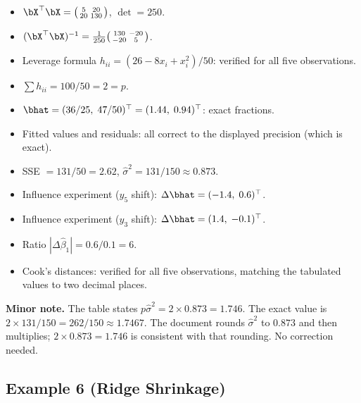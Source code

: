 \begin{itemize}[nosep]
  \item $\bX^\top\bX = \bigl(\begin{smallmatrix}5&20\\20&130\end{smallmatrix}\bigr)$, $\det = 250$. \checkmark
  \item $(\bX^\top\bX)^{-1} = \frac{1}{250}\bigl(\begin{smallmatrix}130&-20\\-20&5\end{smallmatrix}\bigr)$. \checkmark
  \item Leverage formula $h_{ii} = (26-8x_i+x_i^2)/50$: verified for all five observations. \checkmark
  \item $\sum h_{ii} = 100/50 = 2 = p$. \checkmark
  \item $\bhat = (36/25,\;47/50)^\top = (1.44,\;0.94)^\top$: exact fractions. \checkmark
  \item Fitted values and residuals: all correct to the displayed precision (which is exact). \checkmark
  \item SSE $= 131/50 = 2.62$, $\hat\sigma^2 = 131/150 \approx 0.873$. \checkmark
  \item Influence experiment ($y_5$ shift): $\Delta\bhat = (-1.4,\;0.6)^\top$. \checkmark
  \item Influence experiment ($y_3$ shift): $\Delta\bhat = (1.4,\;-0.1)^\top$. \checkmark
  \item Ratio $|\Delta\hat\beta_1| = 0.6/0.1 = 6$. \checkmark
  \item Cook's distances: verified for all five observations, matching the
        tabulated values to two decimal places. \checkmark
\end{itemize}

\medskip
\noindent\textbf{Minor note.}
The table states $p\hat\sigma^2 = 2\times 0.873 = 1.746$.
The exact value is $2 \times 131/150 = 262/150 \approx 1.7467$.
The document rounds $\hat\sigma^2$ to $0.873$ and then multiplies;
$2\times 0.873 = 1.746$ is consistent with that rounding.
No correction needed.



\subsection*{Example 6 (Ridge Shrinkage)}

